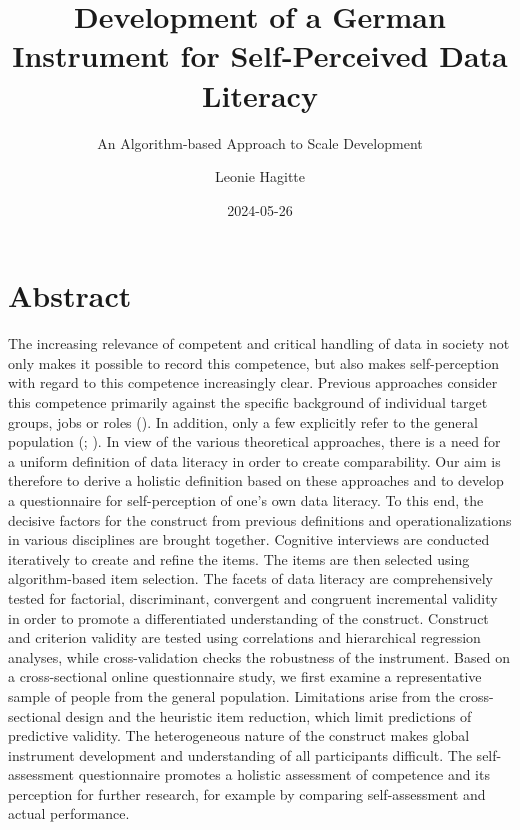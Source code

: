 \documentclass[
  12pt,
  a4paper,
  twoside]{article}
\title{Development of a German Instrument for Self-Perceived Data
Literacy}
\subtitle{An Algorithm-based Approach to Scale Development}
\author{Leonie Hagitte}
\date{2024-05-26}
\begin{document}
\maketitle

\newpage\null\thispagestyle{empty}\newpage

\section*{Abstract}\label{abstract}

The increasing relevance of competent and critical handling of data in
society not only makes it possible to record this competence, but also
makes self-perception with regard to this competence increasingly clear.
Previous approaches consider this competence primarily against the
specific background of individual target groups, jobs or roles
(). In addition, only a few
explicitly refer to the general population
(;
). In view of the various
theoretical approaches, there is a need for a uniform definition of data
literacy in order to create comparability. Our aim is therefore to
derive a holistic definition based on these approaches and to develop a
questionnaire for self-perception of one's own data literacy. To this
end, the decisive factors for the construct from previous definitions
and operationalizations in various disciplines are brought together.
Cognitive interviews are conducted iteratively to create and refine the
items. The items are then selected using algorithm-based item selection.
The facets of data literacy are comprehensively tested for factorial,
discriminant, convergent and congruent incremental validity in order to
promote a differentiated understanding of the construct. Construct and
criterion validity are tested using correlations and hierarchical
regression analyses, while cross-validation checks the robustness of the
instrument. Based on a cross-sectional online questionnaire study, we
first examine a representative sample of people from the general
population. Limitations arise from the cross-sectional design and the
heuristic item reduction, which limit predictions of predictive
validity. The heterogeneous nature of the construct makes global
instrument development and understanding of all participants difficult.
The self-assessment questionnaire promotes a holistic assessment of
competence and its perception for further research, for example by
comparing self-assessment and actual performance.
\end{document}
